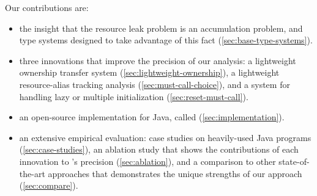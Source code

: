 Our contributions are:
\begin{itemize}
\item the insight that the resource leak problem is an accumulation
  problem, and
  type systems designed to take advantage
  of this fact (\cref{sec:base-type-systems}).
\item three
  innovations that improve the precision of our analysis:
  a lightweight ownership transfer system
  (\cref{sec:lightweight-ownership}), a lightweight resource-alias
  tracking analysis (\cref{sec:must-call-choice}), and a system for
  handling lazy or multiple initialization (\cref{sec:reset-must-call}).
\item an open-source implementation for Java,
  called \tool (\cref{sec:implementation}).
\item an extensive empirical evaluation: case studies on heavily-used
  Java programs (\cref{sec:case-studies}),
  an ablation study that shows the contributions of each innovation to
  \tool's precision (\cref{sec:ablation}), and a comparison to
  other state-of-the-art approaches that demonstrates the unique strengths
  of our approach (\cref{sec:compare}).
\end{itemize}
  

